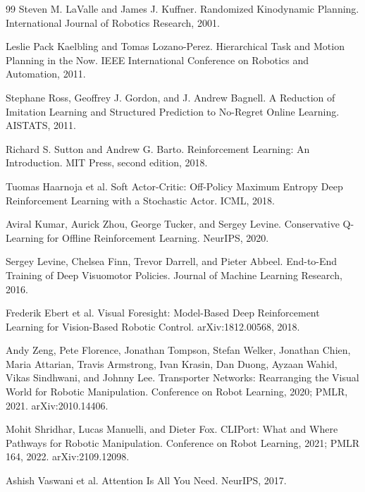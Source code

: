 \documentclass[11pt,oneside,openany]{oblivoir}
\numberwithin{section}{chapter}
\numberwithin{subsection}{section}
\numberwithin{equation}{chapter}
\begin{document}
\begin{thebibliography}{99}
Steven M. LaValle and James J. Kuffner.
\newblock Randomized Kinodynamic Planning.
\newblock International Journal of Robotics Research, 2001.

Leslie Pack Kaelbling and Tomas Lozano-Perez.
\newblock Hierarchical Task and Motion Planning in the Now.
\newblock IEEE International Conference on Robotics and Automation, 2011.

Stephane Ross, Geoffrey J. Gordon, and J. Andrew Bagnell.
\newblock A Reduction of Imitation Learning and Structured Prediction to No-Regret Online Learning.
\newblock AISTATS, 2011.

Richard S. Sutton and Andrew G. Barto.
\newblock Reinforcement Learning: An Introduction.
\newblock MIT Press, second edition, 2018.

Tuomas Haarnoja et al.
\newblock Soft Actor-Critic: Off-Policy Maximum Entropy Deep Reinforcement Learning with a Stochastic Actor.
\newblock ICML, 2018.

Aviral Kumar, Aurick Zhou, George Tucker, and Sergey Levine.
\newblock Conservative Q-Learning for Offline Reinforcement Learning.
\newblock NeurIPS, 2020.

Sergey Levine, Chelsea Finn, Trevor Darrell, and Pieter Abbeel.
\newblock End-to-End Training of Deep Visuomotor Policies.
\newblock Journal of Machine Learning Research, 2016.

Frederik Ebert et al.
\newblock Visual Foresight: Model-Based Deep Reinforcement Learning for Vision-Based Robotic Control.
\newblock arXiv:1812.00568, 2018.

Andy Zeng, Pete Florence, Jonathan Tompson, Stefan Welker, Jonathan Chien,
Maria Attarian, Travis Armstrong, Ivan Krasin, Dan Duong, Ayzaan Wahid,
Vikas Sindhwani, and Johnny Lee.
\newblock Transporter Networks: Rearranging the Visual World for Robotic Manipulation.
\newblock Conference on Robot Learning, 2020; PMLR, 2021. arXiv:2010.14406.

Mohit Shridhar, Lucas Manuelli, and Dieter Fox.
\newblock CLIPort: What and Where Pathways for Robotic Manipulation.
\newblock Conference on Robot Learning, 2021; PMLR 164, 2022. arXiv:2109.12098.

Ashish Vaswani et al.
\newblock Attention Is All You Need.
\newblock NeurIPS, 2017.


\end{thebibliography}
\end{document}
